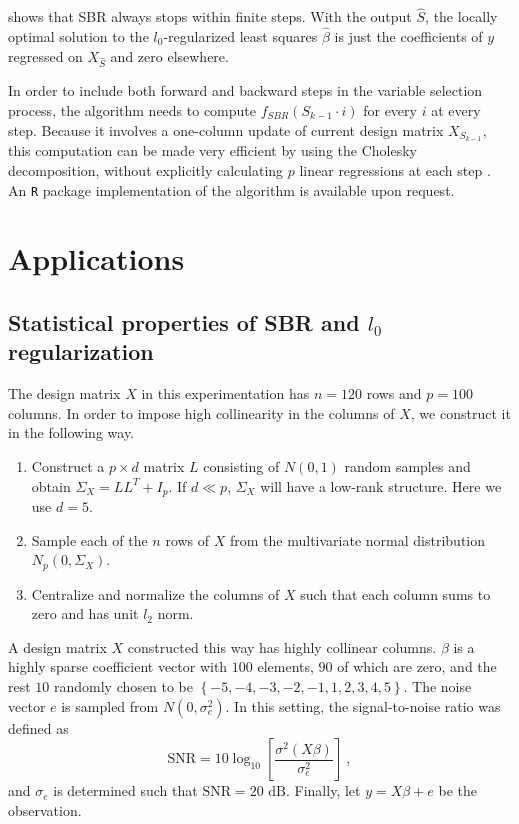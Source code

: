 \documentclass[11pt]{article}%
\numberwithin{equation}{section}
\theoremstyle{plain}
\begin{document}
\cite{soussen2011} shows that SBR always stops within finite steps.  With the output $\hat S$, the locally optimal solution to the $l_0$-regularized least squares $\hat\beta$ is just the coefficients of $y$ regressed on $X_{\hat S}$ and zero elsewhere.

In order to include both forward and backward steps in the variable selection process, the algorithm needs to compute $f_{SBR}(S_{k-1} \cdot i)$ for every $i$ at every step.  Because it involves a one-column update of current design matrix $X_{S_{k - 1}}$, this computation can be made very efficient by using the Cholesky decomposition, without explicitly calculating $p$ linear regressions at each step \citep{soussen2011}.  An \texttt{R} package implementation of the algorithm is available upon request.

\section{Applications \label{eg}}

\subsection{Statistical properties of SBR and $l_0$ regularization \label{perform}}

The design matrix $X$ in this experimentation has $n = 120$ rows and $p = 100$ columns.  In order to impose high collinearity in the columns of $X$, we construct it in the following way.

\begin{enumerate}
\item Construct a $p \times d$ matrix $L$ consisting of $N\left(0, 1\right)$ random samples and obtain $\Sigma_X = LL^T + I_p$.  If $d \ll p$, $\Sigma_X$ will have a low-rank structure.  Here we use $d = 5$.
\item Sample each of the $n$ rows of $X$ from the multivariate normal distribution $N_p\left(0, \Sigma_X\right)$.
\item Centralize and normalize the columns of $X$ such that each column sums to zero and has unit $l_2$ norm.
\end{enumerate}
A design matrix $X$ constructed this way has highly collinear columns.  $\beta$ is a highly sparse coefficient vector with $100$ elements, $90$ of which are zero, and the rest $10$ randomly chosen to be $\left\{-5, -4, -3, -2, -1, 1, 2, 3, 4, 5\right\}$.  The noise vector $e$ is sampled from $N\left(0, \sigma_e^2\right)$.  In this setting, the signal-to-noise ratio was defined as 
$$
\text{SNR}=10\log_{10}\left[\frac{\sigma^2(X\beta)}{\sigma_e^2}\right] \ ,
$$
and $\sigma_e$ is determined such that $\text{SNR}=20\text{ dB}$.  Finally, let $y = X\beta + e$ be the observation.
\end{document}
